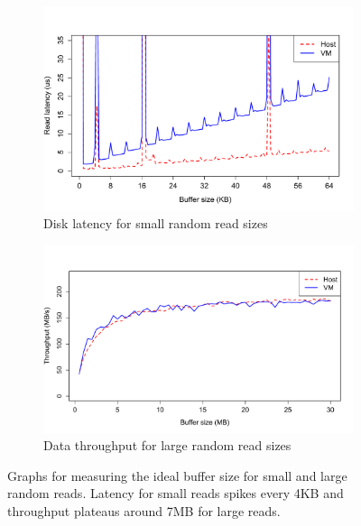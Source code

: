 \begin{figure}[t]
	\begin{subfigure}{0.5\textwidth}
	\includegraphics[width=\textwidth]{./figures/p1_new.pdf}
	\caption{Disk latency for small random read sizes}
	\label{fig:p1block}
	\end{subfigure}

	\begin{subfigure}{0.5\textwidth}
	\includegraphics[width=\textwidth]{./figures/p1_old.pdf}
	\caption{Data throughput for large random read sizes}
	\label{fig:p1graph}
	\end{subfigure}
	\caption{Graphs for measuring the ideal buffer size for small
	and large random reads. Latency for small reads spikes 
	every 4KB and throughput plateaus around 7MB for large reads.}
\end{figure}

